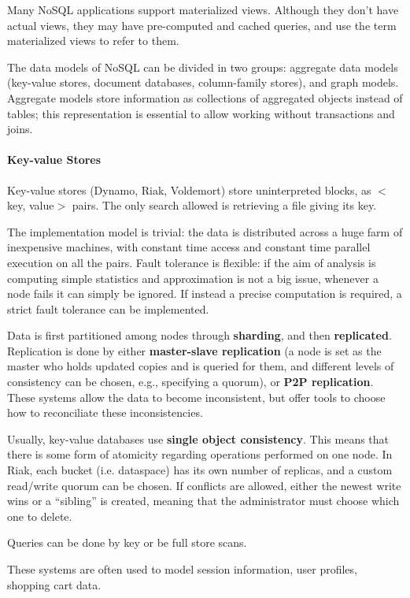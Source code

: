 Many NoSQL applications support materialized views. Although they don't have actual views, they may have pre-computed and cached queries, and use the term materialized views to refer to them.

The data models of NoSQL can be divided in two groups: aggregate data models (key-value stores, document databases, column-family stores), and graph models. Aggregate models store information as collections of aggregated objects instead of tables; this representation is essential to allow working without transactions and joins. 

\paragraph{Key-value Stores}

Key-value stores (Dynamo, Riak, Voldemort) store uninterpreted blocks, as $<$key, value$>$ pairs. The only search allowed is retrieving a file giving its key.

The implementation model is trivial: the data is distributed across a huge farm of inexpensive machines, with constant time access and constant time parallel execution on all the pairs. Fault tolerance is flexible: if the aim of analysis is computing simple statistics and approximation is not a big issue, whenever a node fails it can simply be ignored. If instead a precise computation is required, a strict fault tolerance can be implemented.

Data is first partitioned among nodes through \textbf{sharding}, and then \textbf{replicated}. Replication is done by either \textbf{master-slave replication} (a node is set as the master who holds updated copies and is queried for them, and different levels of consistency can be chosen, e.g., specifying a quorum), or \textbf{P2P replication}. These systems allow the data to become inconsistent, but offer tools to choose how to reconciliate these inconsistencies.

Usually, key-value databases use \textbf{single object consistency}. This means that there is some form of atomicity regarding operations performed on one node. In Riak, each bucket (i.e. dataspace) has its own number of replicas, and a custom read/write quorum can be chosen. If conflicts are allowed, either the newest write wins or a ``sibling'' is created, meaning that the administrator must choose which one to delete.

Queries can be done by key or be full store scans.

These systems are often used to model session information, user profiles, shopping cart data.

